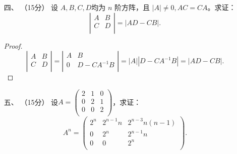 \begin{enumerate}[1~]
\begin{proof}
\[\]
由于$\boldsymbol{\varepsilon} _ { 1 } , \boldsymbol{\varepsilon} _ { 2 } , \dots , \boldsymbol{\varepsilon} _ { n }$线性无关，因此${\rm rank}\{\boldsymbol{\varepsilon} _ { 1 } , \boldsymbol{\varepsilon} _ { 2 } , \dots , \boldsymbol{\varepsilon} _ { n }\}=n$。从而${\rm rank}\{\boldsymbol { \boldsymbol{\alpha} } _ { 1 } , \boldsymbol { \boldsymbol{\alpha} } _ { 2 } , \dots , \boldsymbol { \boldsymbol{\alpha} } _ { n }\}=n$。
于是$\boldsymbol { \boldsymbol{\alpha} } _ { 1 } , \boldsymbol { \boldsymbol{\alpha} } _ { 2 } , \dots , \boldsymbol { \boldsymbol{\alpha} } _ { n }$线性无关。
\end{proof}

\item[四、]（15分）
设 $A, B, C, D $均为 $n$ 阶方阵，且 $|A| \ne 0, AC = CA$。求证：\[
\left| \begin{matrix}
	A&		B\\
	C&		D\\
\end{matrix} \right|=|AD-CB|.
\]
\begin{proof}
\[
\left| \begin{matrix}
	A&		B\\
	C&		D\\
\end{matrix} \right| = 
\left| \begin{matrix}
	A&		B\\
	0&		D-CA^{-1}B\\
\end{matrix} \right| = 
|A||D-CA^{-1}B|=|AD-CB|.
\]
\end{proof}

\item[五、]（15分）
设$A=\left( \begin{smallmatrix}
	2&		1&		0\\
	0&		2&		1\\
	0&		0&		2\\
\end{smallmatrix} \right) $，求证：\[
A^n=\left( \begin{matrix}
	2^n&		2^{n-1}n&		2^{n-3}n\left( n-1 \right)\\
	0&		2^n&		2^{n-1}n\\
	0&		0&		2^n\\
\end{matrix} \right) .
\]


\end{enumerate}
